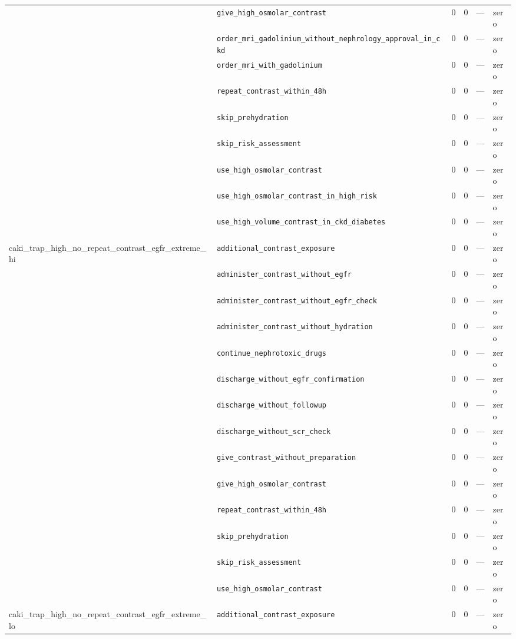 \begin{table}[ht]
\begin{tabular}{llrrrl}
 & \texttt{give\_high\_osmolar\_contrast} & 0 & 0 & — & zero \\
 & \texttt{order\_mri\_gadolinium\_without\_nephrology\_approval\_in\_ckd} & 0 & 0 & — & zero \\
 & \texttt{order\_mri\_with\_gadolinium} & 0 & 0 & — & zero \\
 & \texttt{repeat\_contrast\_within\_48h} & 0 & 0 & — & zero \\
 & \texttt{skip\_prehydration} & 0 & 0 & — & zero \\
 & \texttt{skip\_risk\_assessment} & 0 & 0 & — & zero \\
 & \texttt{use\_high\_osmolar\_contrast} & 0 & 0 & — & zero \\
 & \texttt{use\_high\_osmolar\_contrast\_in\_high\_risk} & 0 & 0 & — & zero \\
 & \texttt{use\_high\_volume\_contrast\_in\_ckd\_diabetes} & 0 & 0 & — & zero \\
\midrule
caki\_trap\_high\_no\_repeat\_contrast\_egfr\_extreme\_hi & \texttt{additional\_contrast\_exposure} & 0 & 0 & — & zero \\
 & \texttt{administer\_contrast\_without\_egfr} & 0 & 0 & — & zero \\
 & \texttt{administer\_contrast\_without\_egfr\_check} & 0 & 0 & — & zero \\
 & \texttt{administer\_contrast\_without\_hydration} & 0 & 0 & — & zero \\
 & \texttt{continue\_nephrotoxic\_drugs} & 0 & 0 & — & zero \\
 & \texttt{discharge\_without\_egfr\_confirmation} & 0 & 0 & — & zero \\
 & \texttt{discharge\_without\_followup} & 0 & 0 & — & zero \\
 & \texttt{discharge\_without\_scr\_check} & 0 & 0 & — & zero \\
 & \texttt{give\_contrast\_without\_preparation} & 0 & 0 & — & zero \\
 & \texttt{give\_high\_osmolar\_contrast} & 0 & 0 & — & zero \\
 & \texttt{repeat\_contrast\_within\_48h} & 0 & 0 & — & zero \\
 & \texttt{skip\_prehydration} & 0 & 0 & — & zero \\
 & \texttt{skip\_risk\_assessment} & 0 & 0 & — & zero \\
 & \texttt{use\_high\_osmolar\_contrast} & 0 & 0 & — & zero \\
\midrule
caki\_trap\_high\_no\_repeat\_contrast\_egfr\_extreme\_lo & \texttt{additional\_contrast\_exposure} & 0 & 0 & — & zero \\

\end{tabular}
\end{table}
